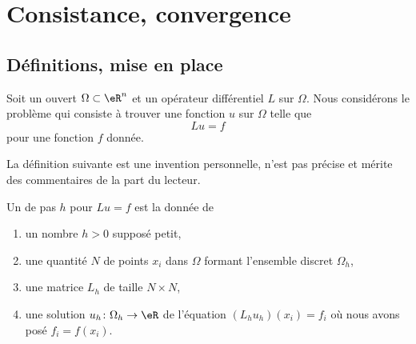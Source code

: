 \section{Consistance, convergence}

\subsection{Définitions, mise en place}

Soit un ouvert \( \Omega\subset \eR^n\) et un opérateur différentiel \( L\) sur \( \Omega\). Nous considérons le problème qui consiste à trouver une fonction \( u\) sur \( \Omega\) telle que
\begin{equation}
	Lu=f
\end{equation}
pour une fonction \( f\) donnée.

\begin{probleme}
	La définition suivante est une invention personnelle, n'est pas précise et mérite des commentaires de la part du lecteur.
\end{probleme}
\begin{definition}
	Un  de pas \( h\) pour \( Lu=f\) est la donnée de
	\begin{enumerate}
		\item
		      un nombre \( h>0\) supposé petit,
		\item
		      une quantité \( N\) de points \( x_i \) dans \( \Omega\) formant l'ensemble discret \( \Omega_h\),
		\item
		      une matrice \( L_h\) de taille \( N\times N\),
		\item
		      une solution \( u_h\colon \Omega_h\to \eR\) de l'équation \( (L_hu_h)(x_i)=f_i\) où nous avons posé \( f_i=f(x_i)\).
	\end{enumerate}
\end{definition}

